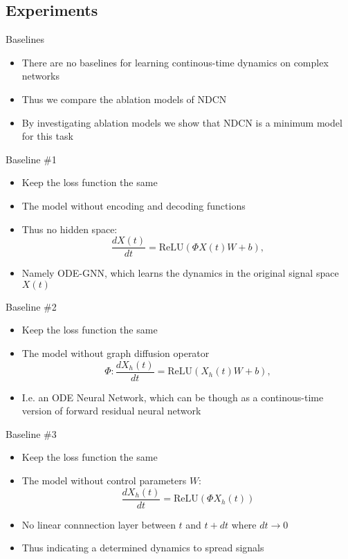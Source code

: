 \documentclass{beamer}
\begin{document}
\subsection{Experiments}
\begin{frame}{Baselines}
\begin{itemize}
\item There are no baselines for learning continous-time dynamics on complex networks
\item Thus we compare the ablation models of NDCN
\item By investigating ablation models we show that NDCN is a minimum model for this task
\end{itemize}
\end{frame}

\begin{frame}{Baseline \#1}
\begin{itemize}
\item Keep the loss function the same
\item The model without encoding and decoding functions
\item Thus no hidden space:\[
\frac{dX(t)}{dt}=\text{ReLU}(\Phi X(t)W+b),
\]
\item Namely ODE-GNN, which learns the dynamics in the original signal space $X(t)$
\end{itemize}
\end{frame}

\begin{frame}{Baseline \#2}
\begin{itemize}
\item Keep the loss function the same
\item The model without graph diffusion operator\[
\Phi: \frac{dX_h(t)}{dt}=\text{ReLU}(X_h(t)W+b),
\]
\item I.e. an ODE Neural Network, which can be though as a continous-time version of forward residual neural network
\end{itemize}
\end{frame}

\begin{frame}{Baseline \#3}
\begin{itemize}
\item Keep the loss function the same
\item The model without control parameters $W$:\[
\frac{dX_h(t)}{dt}=\text{ReLU}(\Phi X_h(t))
\]
\item No linear connnection layer between $t$ and $t+dt$ where $dt\to 0$
\item Thus indicating a determined dynamics to spread signals
\end{itemize}
\end{frame}
\end{document}
